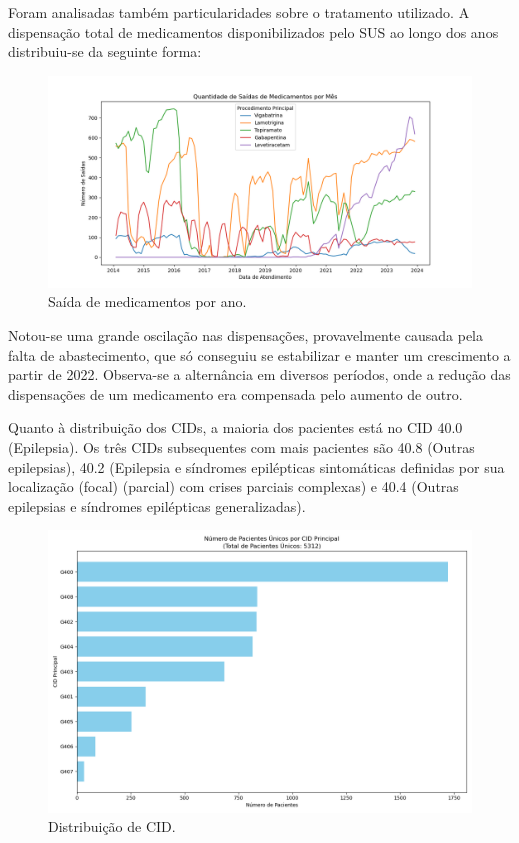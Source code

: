 \documentclass[article,a4paper,12pt,brazil,sumario=tradicional]{abntex2}
\begin{document}
Foram analisadas também particularidades sobre o tratamento utilizado. A dispensação total de medicamentos disponibilizados pelo SUS ao longo dos anos distribuiu-se da seguinte forma:

\begin{figure}[!ht]
    \centering
    \includegraphics[width=1\textwidth]{saida_medicamentos_por_mes.png}
    \caption{Saída de medicamentos por ano.}
    \label{fig:saida_medicamentos_por_mes}
\end{figure}

Notou-se uma grande oscilação nas dispensações, provavelmente causada pela falta de abastecimento, que só conseguiu se estabilizar e manter um crescimento a partir de 2022. Observa-se a alternância em diversos períodos, onde a redução das dispensações de um medicamento era compensada pelo aumento de outro.

Quanto à distribuição dos CIDs, a maioria dos pacientes está no CID 40.0 (Epilepsia). Os três CIDs subsequentes com mais pacientes são 40.8 (Outras epilepsias), 40.2 (Epilepsia e síndromes epilépticas sintomáticas definidas por sua localização (focal) (parcial) com crises parciais complexas) e 40.4 (Outras epilepsias e síndromes epilépticas generalizadas). 


\begin{figure}[!ht]
    \centering
    \includegraphics[width=1\textwidth]{contagem_cid_pacientes_unicos.png}
    \caption{Distribuição de CID.}
    \label{fig:contagem_cid_pacientes_unicos}
\end{figure}
\end{document}
